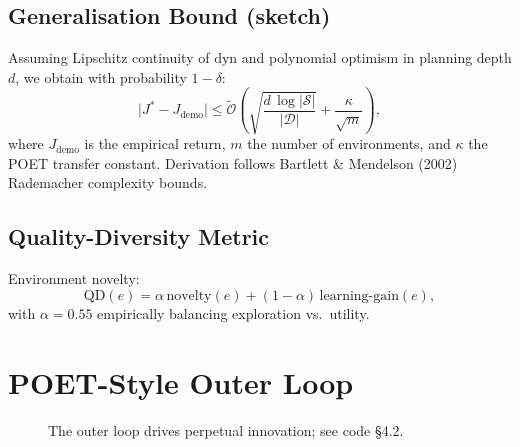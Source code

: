 \documentclass[11pt]{article}
\begin{document}
\subsection{Generalisation Bound (sketch)}

Assuming Lipschitz continuity of $\mathrm{dyn}$ and polynomial
optimism in planning depth $d$, we obtain with probability $1-\delta$:
\[
  \bigl| J^\ast - J_{\text{demo}} \bigr|
  \le
  \tilde{\mathcal{O}}\!\left(
    \sqrt{\frac{d\,\log|\mathcal{S}|}{|\mathcal{D}|}}
    + \frac{\kappa}{\sqrt{m}}
  \right),
\]
where $J_{\text{demo}}$ is the empirical return, $m$ the number of
environments, and $\kappa$ the POET transfer constant.
Derivation follows Bartlett \& Mendelson (2002) Rademacher complexity bounds.

\subsection{Quality-Diversity Metric}

Environment novelty:
\[
\mathrm{QD}(e) = \alpha\,\text{novelty}(e)
               + (1-\alpha)\,\text{learning-gain}(e),
\]
with $\alpha\!=\!0.55$ empirically balancing exploration vs.\ utility.

\section{POET-Style Outer Loop}

\begin{figure}[ht]\centering
{}
\caption{The outer loop drives perpetual innovation; see code §4.2.}
\end{figure}
\end{document}
